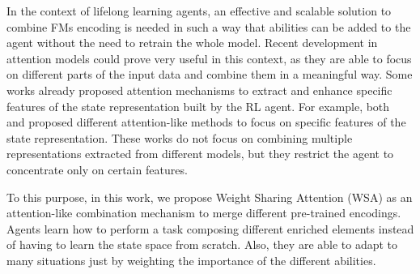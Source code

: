 In the context of lifelong learning agents, an effective and scalable solution to combine FMs encoding is needed in such a way that abilities can be added to the agent without the need to retrain the whole model.
Recent development in attention models could prove very useful in this context, as they are able to focus on different parts of the input data and combine them in a meaningful way.
Some works already proposed attention mechanisms to extract and enhance specific features of the state representation built by the RL agent.
For example, both ~\citet{bramlage2022generalized} and \citet{blakeman2022selective} proposed different attention-like methods to focus on specific features of the state representation.
These works do not focus on combining multiple representations extracted from different models, but they restrict the agent to concentrate only on certain features.


To this purpose, in this work, we propose Weight Sharing Attention (WSA) as an attention-like combination mechanism to merge different pre-trained encodings.
Agents learn how to perform a task composing different enriched elements instead of having to learn the state space from scratch.
Also, they are able to adapt to many situations just by weighting the importance of the different abilities.
